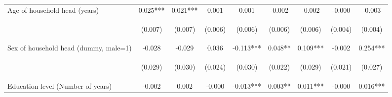 \begin{center}
\begin{tabular}{lcccccccc}
Age of household head (years) & 0.025*** & 0.021*** & 0.001 & 0.001 & -0.002 & -0.002 & -0.000 & -0.003 \\
\vspace{4pt} & \begin{footnotesize}(0.007)\end{footnotesize} & \begin{footnotesize}(0.007)\end{footnotesize} & \begin{footnotesize}(0.006)\end{footnotesize} & \begin{footnotesize}(0.006)\end{footnotesize} & \begin{footnotesize}(0.006)\end{footnotesize} & \begin{footnotesize}(0.006)\end{footnotesize} & \begin{footnotesize}(0.004)\end{footnotesize} & \begin{footnotesize}(0.004)\end{footnotesize} \\
Sex of household head (dummy, male=1) & -0.028 & -0.029 & 0.036 & -0.113*** & 0.048** & 0.109*** & -0.002 & 0.254*** \\
\vspace{4pt} & \begin{footnotesize}(0.029)\end{footnotesize} & \begin{footnotesize}(0.030)\end{footnotesize} & \begin{footnotesize}(0.024)\end{footnotesize} & \begin{footnotesize}(0.030)\end{footnotesize} & \begin{footnotesize}(0.022)\end{footnotesize} & \begin{footnotesize}(0.029)\end{footnotesize} & \begin{footnotesize}(0.021)\end{footnotesize} & \begin{footnotesize}(0.027)\end{footnotesize} \\
Education level (Number of years) & -0.002 & 0.002 & -0.000 & -0.013*** & 0.003** & 0.011*** & -0.000 & 0.016*** \\

\end{tabular}
\end{center}
